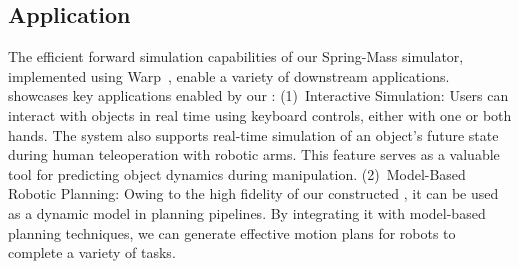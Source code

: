 \subsection{Application}
\label{sec:application}
The efficient forward simulation capabilities of our Spring-Mass simulator, implemented using Warp~\cite{warp2022}, enable a variety of downstream applications.
 showcases key applications enabled by our \ourabbr:
(1)~Interactive Simulation: Users can interact with objects in real time using keyboard controls, either with one or both hands. The system also supports real-time simulation of an object's future state during human teleoperation with robotic arms. This feature serves as a valuable tool for predicting object dynamics during manipulation.
(2)~Model-Based Robotic Planning: Owing to the high fidelity of our constructed \ourabbr, it can be used as a dynamic model in planning pipelines. By integrating it with model-based planning techniques, we can generate effective motion plans for robots to complete a variety of tasks.
